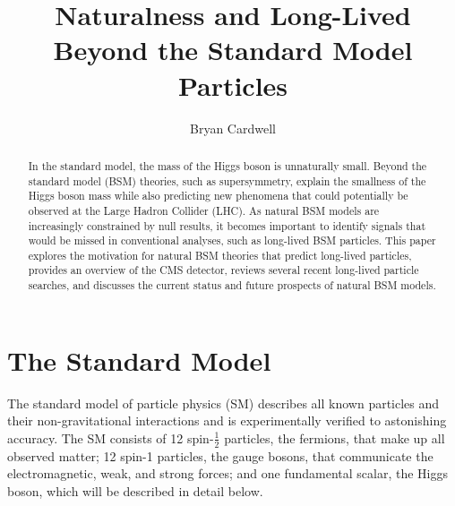 \documentclass[12pt]{article}
\title{Naturalness and Long-Lived Beyond the Standard Model Particles}
\author{Bryan Cardwell}
\begin{document}
\singlespacing
\maketitle

\begin{abstract}
    In the standard model, the mass of the Higgs boson is unnaturally small. Beyond the standard model (BSM) theories, such as supersymmetry, explain the smallness of the Higgs boson mass while also predicting new phenomena that could potentially be observed at the Large Hadron Collider (LHC). As natural BSM models are increasingly constrained by null results, it becomes important to identify signals that would be missed in conventional analyses, such as long-lived BSM particles. This paper explores the motivation for natural BSM theories that predict long-lived particles, provides an overview of the CMS detector, reviews several recent long-lived particle searches, and discusses the current status and future prospects of natural BSM models.

\end{abstract}

\newpage
\tableofcontents
\newpage
\doublespacing
\linenumbers
{}


\section{The Standard Model} \label{SM}
    The standard model of particle physics (SM) describes all known particles and their non-gravitational interactions and is experimentally verified to astonishing  accuracy. The SM consists of \num{12} spin-$\frac{1}{2}$ particles, the fermions, that make up all observed matter; \num{12} spin-1 particles, the gauge bosons, that communicate the electromagnetic, weak, and strong forces; and one fundamental scalar, the Higgs boson, which will be described in detail below.
    
\end{document}

